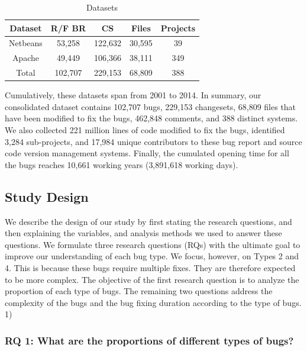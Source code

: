 \begin{table}[h]
\begin{center}
\begin{tabular}{@{}c|c|c|c|c@{}}
\textbf{Dataset} & \textbf{R/F BR} & \textbf{CS} & \textbf{Files} & \textbf{Projects} \\ \hline \hline
Netbeans         & 53,258          & 122,632     & 30,595         & 39                \\
Apache           & 49,449          & 106,366     & 38,111         & 349               \\
Total            & 102,707         & 229,153     & 68,809         & 388               \\ \hline \hline

\end{tabular}
\end{center}

\caption{Datasets\label{table:datasets}}
\end{table}

Cumulatively, these datasets span from 2001 to 2014. In
summary, our consolidated dataset contains 102,707 bugs,
229,153 changesets, 68,809 files that have been modified to
fix the bugs, 462,848 comments, and 388 distinct systems.
We also collected 221 million lines of code modified to fix
the bugs, identified 3,284 sub-projects, and 17,984 unique
contributors to these bug report and source code version
management systems. Finally, the cumulated opening time for
all the bugs reaches 10,661 working years (3,891,618
working days).

\subsection{Study Design}

We describe the design of our study by first stating the
research questions, and then explaining the variables, and
analysis methods we used to answer these questions. We
formulate three research questions (RQs) with the ultimate
goal to improve our understanding of each bug type. We
focus, however, on Types 2 and 4. This is because these bugs
require multiple fixes. They are therefore expected to be more
complex.
The objective of the first research question is to analyze
the proportion of each type of bugs. The remaining two
questions address the complexity of the bugs and the bug
fixing duration according to the type of bugs.
1)

\subsubsection{RQ 1: What are the proportions of different types of bugs?}

